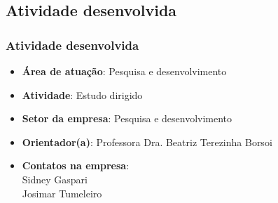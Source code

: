 \subsection{Atividade desenvolvida}
\begin{frame}
\frametitle{Atividade desenvolvida}

\begin{itemize}
	\item \textbf{Área de atuação}: Pesquisa e desenvolvimento
	\pause
	\item \textbf{Atividade}: Estudo dirigido
	\pause
	\item \textbf{Setor da empresa}: Pesquisa e desenvolvimento
	\pause	
	\item \textbf{Orientador(a)}: Professora Dra. Beatriz Terezinha Borsoi
	\pause
	\item \textbf{Contatos na empresa}: \\Sidney Gaspari\\ Josimar Tumeleiro
	\pause

\end{itemize}
\end{frame}














